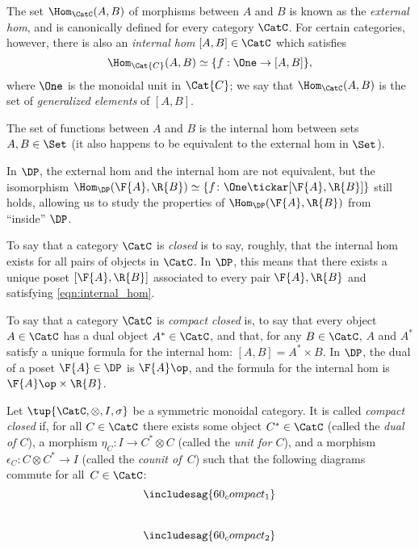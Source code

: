 \begin{shaded}
\begin{definition}
The set $\Hom_\CatC(A,B)$ of morphisms between $A$ and $B$ is known as the \emph{external hom}, and is canonically defined for every category $\CatC$. For certain categories, however, there is also an \emph{internal hom} $[A,B] \in \CatC$ which satisfies
\begin{equation}
\label{eqn:internal_hom}
\Hom_\Cat{C}(A,B) \simeq \{ f : \One \to [A,B] \},
\end{equation}
where $\One$ is the monoidal unit in $\Cat{C}$; we say that $\Hom_\CatC(A,B)$ is the set of \emph{generalized elements} of $[A,B]$. 
\end{definition}
\end{shaded}
\begin{example}
The set of functions between $A$ and $B$ is the internal hom between sets $A,B \in \Set$ (it also happens to be equivalent to the external hom in $\Set$).
\end{example}

In $\DP$, the external hom and the internal hom are not equivalent, but the isomorphism $\Hom_\DP(\F{A},\R{B}) \simeq \{ f \colon \One \tickar [\F{A},\R{B}] \}$ still holds, allowing us to study the properties of $\Hom_\DP(\F{A},\R{B})$ from ``inside'' $\DP$.

To say that a category $\CatC$ is \emph{closed} is to say, roughly, that the internal hom exists for all pairs of objects in $\CatC$. In $\DP$, this means that there exists a unique poset $[\F{A},\R{B}]$ associated to every pair $\F{A},\R{B}$ and satisfying \cref{eqn:internal_hom}. 

To say that a category $\CatC$ is \emph{compact closed} is, to say that every object $A \in \CatC$ has a dual object $A^* \in \CatC$, and that, for any $B \in \CatC$, $A$ and $A^*$ satisfy a unique formula for the internal hom: $[A,B] = A^* \times B$. In $\DP$, the dual of a poset $\F{A} \in \DP$ is $\F{A}\op$, and the formula for the internal hom is $\F{A}\op \times \R{B}$.

\begin{shaded}
\begin{definition}
Let $\tup{\CatC,\otimes,I,\sigma}$ be a symmetric monoidal category. It is called \emph{compact closed} if, for all $C \in\CatC$ there exists some object $C^*\in\CatC$ (called the \emph{dual of $C$}), a morphism $\eta_C\colon I\to C^*\otimes C$ (called the \emph{unit for $C$}), and a morphism $\epsilon_C\colon C\otimes C^*\to I$ (called the \emph{counit of~$C$}) such that the following diagrams commute for all~$C\in \CatC$:
\begin{equation}\label{eqn:ccc}
\includesag{60_compact_1}
\end{equation}
~
\begin{equation}
    \includesag{60_compact_2}
\end{equation}
\end{definition}
\end{shaded}

